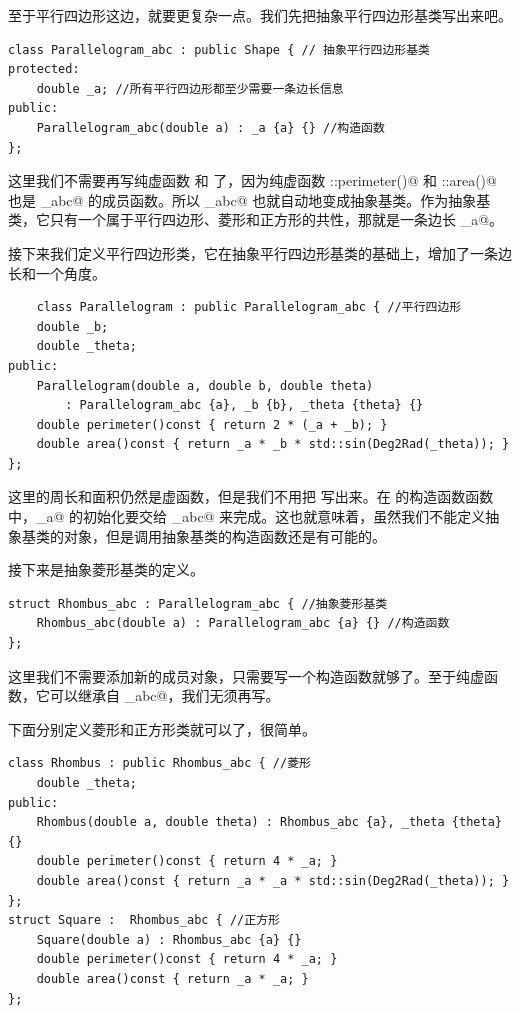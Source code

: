 至于平行四边形这边，就要更复杂一点。我们先把抽象平行四边形基类写出来吧。
\begin{lstlisting}
class Parallelogram_abc : public Shape { // 抽象平行四边形基类
protected:
    double _a; //所有平行四边形都至少需要一条边长信息
public:
    Parallelogram_abc(double a) : _a {a} {} //构造函数
};
\end{lstlisting}
这里我们不需要再写纯虚函数 \lstinline@perimeter@ 和 \lstinline@area@ 了，因为纯虚函数 \lstinline@Shape::perimeter()@ 和 \lstinline@Shape::area()@ 也是 \lstinline@Parallelogram_abc@ 的成员函数。所以 \lstinline@Parallelogram_abc@ 也就自动地变成抽象基类。作为抽象基类，它只有一个属于平行四边形、菱形和正方形的共性，那就是一条边长 \lstinline@_a@。\par
接下来我们定义平行四边形类，它在抽象平行四边形基类的基础上，增加了一条边长和一个角度。
\begin{lstlisting}
    class Parallelogram : public Parallelogram_abc { //平行四边形
    double _b;
    double _theta;
public:
    Parallelogram(double a, double b, double theta)
        : Parallelogram_abc {a}, _b {b}, _theta {theta} {}
    double perimeter()const { return 2 * (_a + _b); }
    double area()const { return _a * _b * std::sin(Deg2Rad(_theta)); }
};
\end{lstlisting}
这里的周长和面积仍然是虚函数，但是我们不用把 \lstinline@virtual@ 写出来。在 \lstinline@Parallelogram@ 的构造函数函数中，\lstinline@_a@ 的初始化要交给 \lstinline@Parallelogram_abc@ 来完成。这也就意味着，虽然我们不能定义抽象基类的对象，但是调用抽象基类的构造函数还是有可能的。\par
接下来是抽象菱形基类的定义。
\begin{lstlisting}
struct Rhombus_abc : Parallelogram_abc { //抽象菱形基类
    Rhombus_abc(double a) : Parallelogram_abc {a} {} //构造函数
};
\end{lstlisting}
这里我们不需要添加新的成员对象，只需要写一个构造函数就够了。至于纯虚函数，它可以继承自 \lstinline@Parallelogram_abc@，我们无须再写。\par
下面分别定义菱形和正方形类就可以了，很简单。
\begin{lstlisting}
class Rhombus : public Rhombus_abc { //菱形
    double _theta;
public:
    Rhombus(double a, double theta) : Rhombus_abc {a}, _theta {theta} {}
    double perimeter()const { return 4 * _a; }
    double area()const { return _a * _a * std::sin(Deg2Rad(_theta)); }
};
struct Square :  Rhombus_abc { //正方形
    Square(double a) : Rhombus_abc {a} {}
    double perimeter()const { return 4 * _a; }
    double area()const { return _a * _a; }
};
\end{lstlisting}\pagebreak
